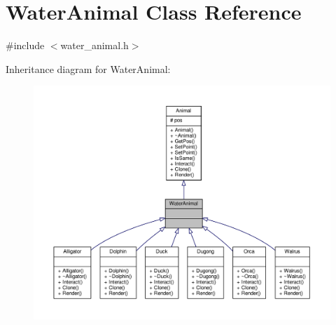 \hypertarget{classWaterAnimal}{}\section{Water\+Animal Class Reference}
\label{classWaterAnimal}


{\ttfamily \#include $<$water\+\_\+animal.\+h$>$}



Inheritance diagram for Water\+Animal\+:
\nopagebreak
\begin{figure}[H]
\begin{center}
\leavevmode
\includegraphics[width=350pt]{classWaterAnimal__inherit__graph}
\end{center}
\end{figure}


